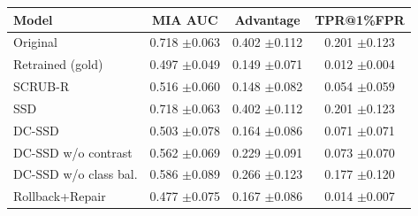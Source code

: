 \begin{tabular}{lccc}
\toprule
Model & MIA AUC & Advantage & TPR@1\%FPR \\
\midrule
Original & 0.718 {\scriptsize$\pm$0.063} & 0.402 {\scriptsize$\pm$0.112} & 0.201 {\scriptsize$\pm$0.123} \\
Retrained (gold) & 0.497 {\scriptsize$\pm$0.049} & 0.149 {\scriptsize$\pm$0.071} & 0.012 {\scriptsize$\pm$0.004} \\
SCRUB-R & 0.516 {\scriptsize$\pm$0.060} & 0.148 {\scriptsize$\pm$0.082} & 0.054 {\scriptsize$\pm$0.059} \\
SSD & 0.718 {\scriptsize$\pm$0.063} & 0.402 {\scriptsize$\pm$0.112} & 0.201 {\scriptsize$\pm$0.123} \\
DC-SSD & 0.503 {\scriptsize$\pm$0.078} & 0.164 {\scriptsize$\pm$0.086} & 0.071 {\scriptsize$\pm$0.071} \\
DC-SSD w/o contrast & 0.562 {\scriptsize$\pm$0.069} & 0.229 {\scriptsize$\pm$0.091} & 0.073 {\scriptsize$\pm$0.070} \\
DC-SSD w/o class bal. & 0.586 {\scriptsize$\pm$0.089} & 0.266 {\scriptsize$\pm$0.123} & 0.177 {\scriptsize$\pm$0.120} \\
Rollback+Repair & 0.477 {\scriptsize$\pm$0.075} & 0.167 {\scriptsize$\pm$0.086} & 0.014 {\scriptsize$\pm$0.007} \\
\bottomrule
\end{tabular}
